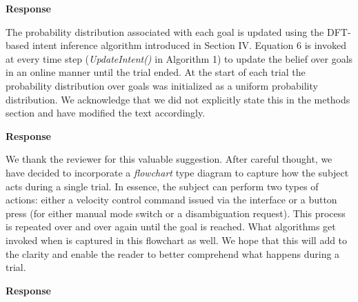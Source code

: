 \documentclass[a4paper,twoside,11pt]{reviewresponse}
\begin{document}

\textbf{Response}

The probability distribution associated with each goal is updated using the DFT-based intent inference algorithm introduced in Section IV. Equation 6 is invoked at every time step (\textit{UpdateIntent()} in Algorithm 1) to update the belief over goals in an online manner until the trial ended. At the start of each trial the probability distribution over goals was initialized as a uniform probability distribution. We acknowledge that we did not explicitly state this in the methods section and have modified the text accordingly.


\textbf{Response}

We thank the reviewer for this valuable suggestion. After careful thought, we have decided to incorporate a \textit{flowchart} type diagram to capture how the subject acts during a single trial. In essence, the subject can perform two types of actions: either a velocity control command issued via the interface or a button press (for either manual mode switch or a disambiguation request). This process is repeated over and over again until the goal is reached. What algorithms get invoked when is captured in this flowchart as well. We hope that this will add to the clarity and enable the reader to better comprehend what happens during a trial. 

\textbf{Response}
\end{document}
